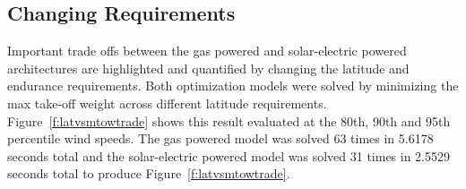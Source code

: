 \newpage



\subsection{Changing Requirements}

Important trade offs between the gas powered and solar-electric powered architectures are highlighted and quantified by changing the latitude and endurance requirements.   
Both optimization models were solved by minimizing the max take-off weight across different latitude requirements. 
Figure~\ref{f:latvsmtowtrade} shows this result evaluated at the 80th, 90th and 95th percentile wind speeds.  
The gas powered model was solved 63 times in 5.6178 seconds total and the solar-electric powered model was solved 31 times in 2.5529 seconds total to produce Figure~\ref{f:latvsmtowtrade}.

